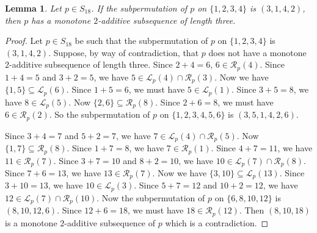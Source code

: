 \documentclass[11pt]{article}
\newtheorem{lemma}[theorem]{Lemma}
\theoremstyle{definition}
\begin{document}
\begin{lemma}\label{Lemma:Monotone3142}
Let $p\in S_{18}$. If the subpermutation of $p$ on $\{1,2,3,4\}$ is $(3,1,4,2)$, then $p$ has a monotone $2$-additive subsequence of length three.
\end{lemma}
\begin{proof}
    Let $p\in S_{18}$ be such that the subpermutation of $p$ on $\{1,2,3,4\}$ is $(3,1,4,2)$. Suppose, by way of contradiction, that $p$ does not have a monotone $2$-additive subsequence of length three. Since $2+4=6$, $6\in\mathcal{R}_p(4)$. Since $1+4=5$ and $3+2=5$, we have $5\in\mathcal{L}_p(4)\cap\mathcal{R}_p(3)$. Now we have $\{1,5\}\subseteq\mathcal{L}_p(6)$. Since $1+5=6$, we must have $5\in\mathcal{L}_p(1)$. Since $3+5=8$, we have $8\in\mathcal{L}_p(5)$. Now $\{2,6\}\subseteq\mathcal{R}_p(8)$. Since $2+6=8$, we must have $6\in\mathcal{R}_p(2)$. So the subpermutation of $p$ on $\{1,2,3,4,5,6\}$ is $(3,5,1,4,2,6)$.

    Since $3+4=7$ and $5+2=7$, we have $7\in\mathcal{L}_p(4)\cap\mathcal{R}_p(5)$. Now $\{1,7\}\subseteq\mathcal{R}_p(8)$. Since $1+7=8$, we have $7\in\mathcal{R}_p(1)$. Since $4+7=11$, we have $11\in\mathcal{R}_p(7)$. Since $3+7=10$ and $8+2=10$, we have $10\in\mathcal{L}_p(7)\cap\mathcal{R}_p(8)$. Since $7+6=13$, we have $13\in\mathcal{R}_p(7)$. Now we have $\{3,10\}\subseteq\mathcal{L}_p(13)$. Since $3+10=13$, we have $10\in\mathcal{L}_p(3)$. Since $5+7=12$ and $10+2=12$, we have $12\in\mathcal{L}_p(7)\cap\mathcal{R}_p(10)$. Now the subpermutation of $p$ on $\{6,8,10,12\}$ is $(8,10,12,6)$. Since $12+6=18$, we must have $18\in\mathcal{R}_p(12)$. Then $(8,10,18)$ is a monotone $2$-additive subsequence of $p$ which is a contradiction. 
\end{proof}
\end{document}
